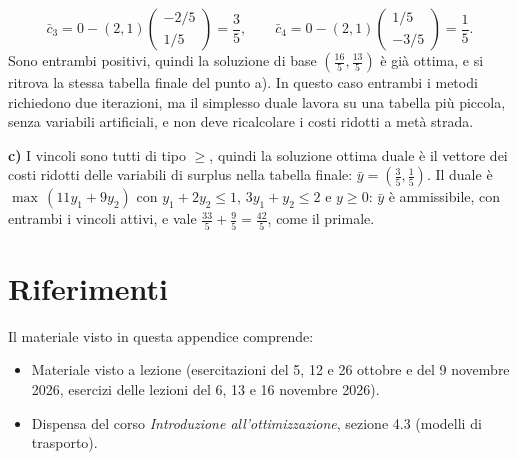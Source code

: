 \[
\bar{c}_3 = 0 - (2, 1) \begin{pmatrix} -2/5 \\ 1/5 \end{pmatrix} = \frac35, \qquad
\bar{c}_4 = 0 - (2, 1) \begin{pmatrix} 1/5 \\ -3/5 \end{pmatrix} = \frac15.
\]
Sono entrambi positivi, quindi la soluzione di base $(\frac{16}{5}, \frac{13}{5})$ è già ottima, e si ritrova la stessa tabella finale del punto a). In questo caso entrambi i metodi richiedono due iterazioni, ma il simplesso duale lavora su una tabella più piccola, senza variabili artificiali, e non deve ricalcolare i costi ridotti a metà strada.

\textbf{c)} I vincoli sono tutti di tipo $\ge$, quindi la soluzione ottima duale è il vettore dei costi ridotti delle variabili di surplus nella tabella finale: $\bar{y} = (\frac35, \frac15)$. Il duale è $\max\, (11y_1 + 9y_2)$ con $y_1 + 2y_2 \le 1$, $3y_1 + y_2 \le 2$ e $y \ge 0$: $\bar{y}$ è ammissibile, con entrambi i vincoli attivi, e vale $\frac{33}{5} + \frac95 = \frac{42}{5}$, come il primale.

\section*{Riferimenti}
Il materiale visto in questa appendice comprende:
\begin{itemize}
    \item Materiale visto a lezione (esercitazioni del 5, 12 e 26 ottobre e del 9 novembre 2026, esercizi delle lezioni del 6, 13 e 16 novembre 2026).
    \item Dispensa del corso \emph{Introduzione all'ottimizzazione}, sezione 4.3 (modelli di trasporto).
\end{itemize}
